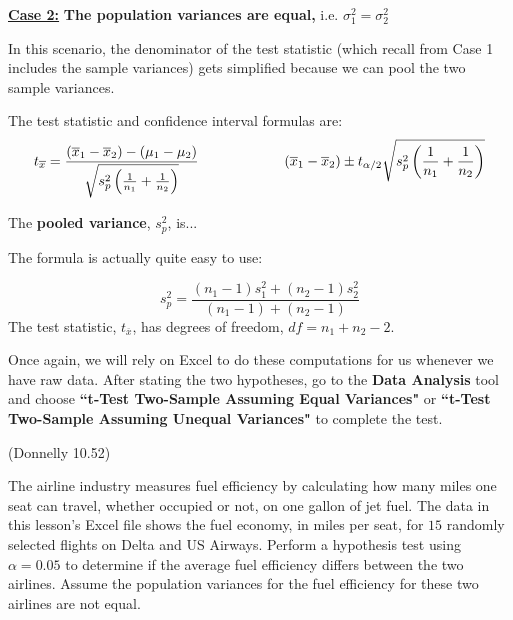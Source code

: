 \documentclass[12pt, letterpaper]{article}
\newcounter{exercise}
\theoremstyle{definition}
\begin{document}
\enlargethispage{3\baselineskip}

\begin{statement}
\textbf{\underline{Case 2:}}  \textbf{The population variances are equal,} i.e. $\sigma_1^2 = \sigma_2^2$

In this scenario, the denominator of the test statistic (which recall from Case 1 includes the sample variances) gets simplified because we can pool the two sample variances.

\vspace*{.1in}

The test statistic and confidence interval formulas are:
$$ t_{\overline{x}} = \frac{(\overline{x}_1-\overline{x}_2)-(\mu_1-\mu_2)}{\sqrt{s_p^2\left(\frac{1}{n_1}+\frac{1}{n_2}\right)}}\hspace*{.85in}  (\overline{x}_1-\overline{x}_2)\pm t_{\alpha/2}\sqrt{s_p^2\left(\frac{1}{n_1}+\frac{1}{n_2}\right)} $$

The \textbf{pooled variance}, $s_p^2$, is...
\vspace*{.3in}

The formula is actually quite easy to use:

$$ s_p^2 = \frac{(n_1-1)s_1^2 +(n_2-1)s_2^2}{(n_1-1)+(n_2-1)} $$
The test statistic, $t_{\overline{x}}$, has degrees of freedom, $df = n_1+n_2-2$.


\end{statement}


\newpage

\noindent Once again, we will rely on Excel to do these computations for us whenever we have raw data.  After stating the two hypotheses, go to the \textbf{Data Analysis} tool and choose \textbf{``t-Test Two-Sample Assuming Equal Variances"} or \textbf{``t-Test Two-Sample Assuming Unequal Variances"} to complete the test.


\begin{exercise}  (Donnelly 10.52)

The airline industry measures fuel efficiency by calculating how many miles one seat can travel, whether occupied or not, on one gallon of jet fuel.  The data in this lesson's Excel file shows the fuel economy, in miles per seat, for $15$ randomly selected flights on Delta and US Airways.  Perform a hypothesis test using $\alpha = 0.05$ to determine if the average fuel efficiency differs between the two airlines.  Assume the population variances for the fuel efficiency for these two airlines are not equal.

\end{exercise}
\end{document}
